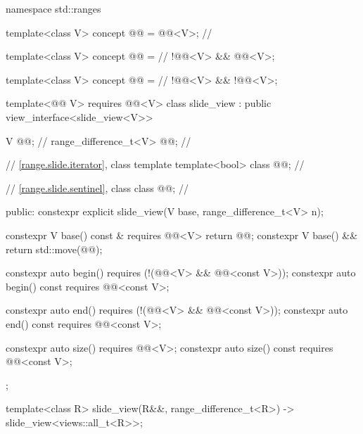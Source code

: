 %
%
%
\begin{codeblock}
namespace std::ranges {
  template<class V>
  concept @@ = @@<V>;                 // \expos

  template<class V>
  concept @@ =                                            // \expos
    !@@<V> && @@<V>;

  template<class V>
  concept @@ =                                           // \expos
    !@@<V> && !@@<V>;

  template<@@ V>
    requires @@<V>
  class slide_view : public view_interface<slide_view<V>> {
    V @@;                            // \expos
    range_difference_t<V> @@;           // \expos

    // \ref{range.slide.iterator}, class template 
    template<bool> class @@;      // \expos

    // \ref{range.slide.sentinel}, class 
    class @@;                     // \expos

  public:
    constexpr explicit slide_view(V base, range_difference_t<V> n);

    constexpr V base() const & requires @@<V> { return @@; }
    constexpr V base() && { return std::move(@@); }

    constexpr auto begin()
      requires (!(@@<V> && @@<const V>));
    constexpr auto begin() const requires @@<const V>;

    constexpr auto end()
      requires (!(@@<V> && @@<const V>));
    constexpr auto end() const requires @@<const V>;

    constexpr auto size() requires @@<V>;
    constexpr auto size() const requires @@<const V>;
  };

  template<class R>
    slide_view(R&&, range_difference_t<R>) -> slide_view<views::all_t<R>>;
}
\end{codeblock}

